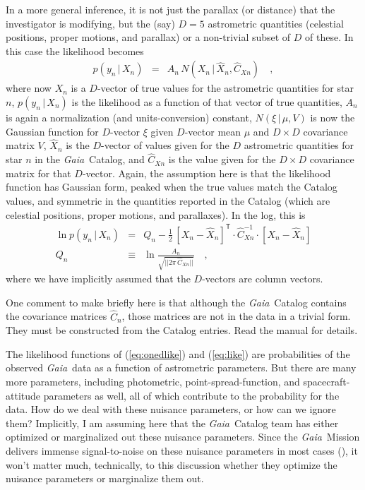 \documentclass[12pt, modern]{aastex62h}
\newcommand{\Gaia}{\textsl{Gaia}}
\newcommand{\given}{\,|\,}
\newcommand{\T}{^{\mathsf{T}}}
\newcommand{\inv}{^{-1}}
\begin{document}
In a more general inference, it is not just the parallax (or distance)
that the investigator is modifying, but the (say) $D=5$ astrometric quantities
(celestial positions, proper motions, and parallax)
or a non-trivial subset of $D$ of these.
In this case the likelihood becomes
\begin{eqnarray}
p(y_n\given X_n) &=& A_n\,N(X_n\given\hat{X}_n,\hat{C}_{Xn})
\label{eq:like}
\quad ,
\end{eqnarray}
where now
$X_n$ is a $D$-vector of true values for the astrometric quantities for star $n$,
$p(y_n\given X_n)$ is the likelihood as a function of that vector of true quantities,
$A_n$ is again a normalization (and units-conversion) constant,
$N(\xi\given\mu,V)$ is now the Gaussian function for $D$-vector $\xi$ given $D$-vector mean $\mu$ and $D\times D$ covariance matrix $V$,
$\hat{X}_n$ is the $D$-vector of values given for the $D$ astrometric quantities for star $n$ in the \Gaia\ Catalog,
and $\hat{C}_{Xn}$ is the value given for the $D\times D$ covariance matrix for that
$D$-vector.
Again, the assumption here is that the likelihood function has Gaussian form, peaked
when the true values match the Catalog values, and symmetric in the quantities
reported in the Catalog (which are celestial positions, proper motions, and parallaxes).
In the log, this is
\begin{eqnarray}
\ln p(y_n\given X_n) &=& Q_n - \frac{1}{2}\,[X_n - \hat{X}_n]\T\cdot\hat{C}_{Xn}\inv\cdot [X_n - \hat{X}_n]
\\
Q_n &\equiv& \ln\frac{A_n}{\sqrt{||2\pi\,\hat{C}_{Xn}||}}
\quad ,
\end{eqnarray}
where we have implicitly assumed that the $D$-vectors are column vectors.

One comment to make briefly here is that although the \Gaia\ Catalog contains
the covariance matrices $\hat{C}_n$, those matrices are not in the data in a
trivial form.
They must be constructed from the Catalog entries.
Read the manual for details.

The likelihood functions of (\ref{eq:onedlike}) and (\ref{eq:like}) are
probabilities of the observed \Gaia\ data as a
function of astrometric parameters.
But there are many more parameters, including photometric, point-spread-function,
and spacecraft-attitude parameters as well, all of which contribute to the probability
for the data.
How do we deal with these nuisance parameters, or how can we ignore them?
Implicitly, I am assuming here that the \Gaia\ Catalog team has either optimized
or marginalized out these nuisance parameters.
Since the \Gaia\ Mission delivers immense signal-to-noise on these nuisance
parameters in most cases (\citealt{holl}), it won't matter much, technically, to this
discussion whether they optimize
the nuisance parameters or marginalize them out.
\end{document}

